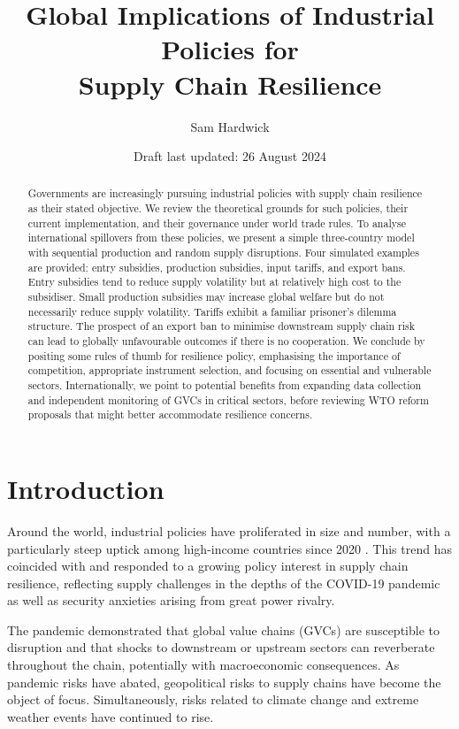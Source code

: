 \documentclass{article}
\title{Global Implications of Industrial Policies for \\ Supply Chain Resilience}
\author{Sam Hardwick}
\date{Draft last updated: 26 August 2024}
\begin{document}
\begin{titlingpage}
    \maketitle
    \begin{abstract}
        Governments are increasingly pursuing industrial policies with supply chain resilience as their stated objective. We review the theoretical grounds for such policies, their current implementation, and their governance under world trade rules. To analyse international spillovers from these policies, we present a simple three-country model with sequential production and random supply disruptions. Four simulated examples are provided: entry subsidies, production subsidies, input tariffs, and export bans. Entry subsidies tend to reduce supply volatility but at relatively high cost to the subsidiser. Small production subsidies may increase global welfare but do not necessarily reduce supply volatility. Tariffs exhibit a familiar prisoner's dilemma structure. The prospect of an export ban to minimise downstream supply chain risk can lead to globally unfavourable outcomes if there is no cooperation. We conclude by positing some rules of thumb for resilience policy, emphasising the importance of competition, appropriate instrument selection, and focusing on essential and vulnerable sectors. Internationally, we point to potential benefits from expanding data collection and independent monitoring of GVCs in critical sectors, before reviewing WTO reform proposals that might better accommodate resilience concerns.
    \end{abstract}
\end{titlingpage}

\section{Introduction}

Around the world, industrial policies have proliferated in size and number, with a particularly steep uptick among high-income countries since 2020 \parencite{ilyina_industrial_2024}. This trend has coincided with and responded to a growing policy interest in supply chain resilience, reflecting supply challenges in the depths of the COVID-19 pandemic as well as security anxieties arising from great power rivalry.

The pandemic demonstrated that global value chains (GVCs) are susceptible to disruption and that shocks to downstream or upstream sectors can reverberate throughout the chain, potentially with macroeconomic consequences. As pandemic risks have abated, geopolitical risks to supply chains have become the object of focus. Simultaneously, risks related to climate change and extreme weather events have continued to rise.
\end{document}
